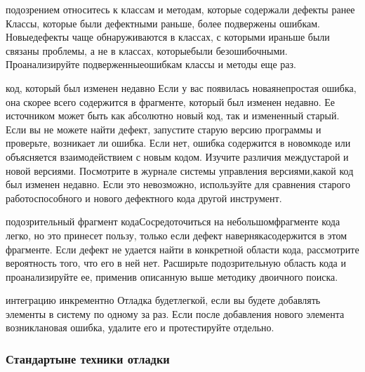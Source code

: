 \documentclass[a4paper]{article}
\begin{document}
{  подозрением  относитесь  к  классам  и  методам,  которые содержали дефекты ранее} Классы, которые были дефектными раньше, более подвержены ошибкам. Новыедефекты  чаще  обнаруживаются  в  классах,  с  которыми  ираньше  были  связаны  проблемы,  а  не  в  классах,  которыебыли  безошибочными.  Проанализируйте  подверженныеошибкам  классы  и  методы  еще  раз.

{  код,  который  был  изменен  недавно} Если  у  вас  появилась  новаянепростая ошибка, она скорее всего содержится в фрагменте, который был изменен  недавно.  Ее  источником  может  быть  как  абсолютно  новый  код,  так  и  измененный  старый.  Если  вы  не  можете  найти  дефект,  запустите  старую  версию  программы  и  проверьте,  возникает  ли  ошибка.  Если  нет,  ошибка  содержится  в  новомкоде  или  объясняется  взаимодействием  с  новым  кодом.  Изучите  различия  междустарой  и  новой  версиями.  Посмотрите  в  журнале  системы  управления  версиями,какой  код  был  изменен  недавно.  Если  это  невозможно,  используйте  для  сравнения  старого  работоспособного  и  нового  дефектного  кода  другой  инструмент.

{ подозрительный фрагмент кода}Сосредоточиться на небольшомфрагменте  кода  легко,  но  это  принесет  пользу,  только  если  дефект  навернякасодержится  в  этом  фрагменте.  Если  дефект  не  удается  найти  в  конкретной  области  кода,  рассмотрите  вероятность  того,  что  его  в  ней  нет.  Расширьте  подозрительную  область  кода  и  проанализируйте  ее,  применив  описанную  выше  методику  двоичного  поиска.

{ интеграцию инкрементно} Отладка будетлегкой,  если  вы  будете  добавлять  элементы  в  систему  по  одному за раз. Если после добавления нового элемента возниклановая  ошибка,  удалите  его  и  протестируйте  отдельно.

\subsubsection{Стандартыне техники отладки}
\end{document}
